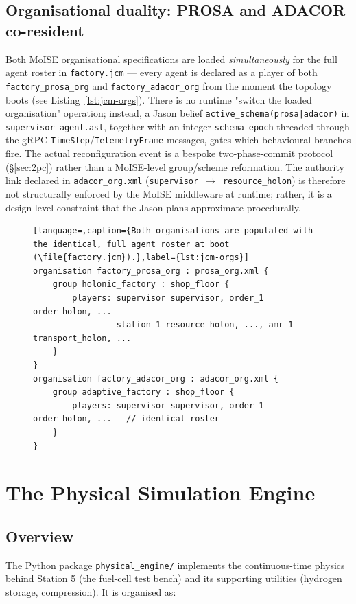 \documentclass[twocolumn,10pt,a4paper]{article}
\newcommand{\code}[1]{\texttt{\small #1}}
\newcommand{\file}[1]{\texttt{#1}}
\begin{document}
\subsection{Organisational duality: PROSA and ADACOR co-resident}
\label{sec:org-duality}
Both MoISE organisational specifications are loaded \emph{simultaneously} for the full agent roster in \file{factory.jcm} --- every agent is declared as a player of both \code{factory\_prosa\_org} and \code{factory\_adacor\_org} from the moment the topology boots (see Listing~\ref{lst:jcm-orgs}). There is no runtime "switch the loaded organisation" operation; instead, a Jason belief \code{active\_schema(prosa|adacor)} in \code{supervisor\_agent.asl}, together with an integer \code{schema\_epoch} threaded through the gRPC \code{TimeStep}/\code{TelemetryFrame} messages, gates which behavioural branches fire. The actual reconfiguration event is a bespoke two-phase-commit protocol (\S\ref{sec:2pc}) rather than a MoISE-level group/scheme reformation. The authority link declared in \code{adacor\_org.xml} (\code{supervisor}~$\to$~\code{resource\_holon}) is therefore not structurally enforced by the MoISE middleware at runtime; rather, it is a design-level constraint that the Jason plans approximate procedurally.

\begin{figure}[t]
\begin{lstlisting}[language=,caption={Both organisations are populated with the identical, full agent roster at boot (\file{factory.jcm}).},label={lst:jcm-orgs}]
organisation factory_prosa_org : prosa_org.xml {
    group holonic_factory : shop_floor {
        players: supervisor supervisor, order_1 order_holon, ...
                 station_1 resource_holon, ..., amr_1 transport_holon, ...
    }
}
organisation factory_adacor_org : adacor_org.xml {
    group adaptive_factory : shop_floor {
        players: supervisor supervisor, order_1 order_holon, ...   // identical roster
    }
}
\end{lstlisting}
\end{figure}

\section{The Physical Simulation Engine}
\label{ch:physics}

\subsection{Overview}
The Python package \file{physical\_engine/} implements the continuous-time physics behind Station 5 (the fuel-cell test bench) and its supporting utilities (hydrogen storage, compression). It is organised as:
\end{document}
